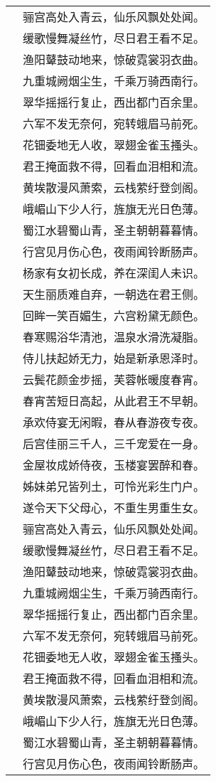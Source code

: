 \documentclass[12pt]{article}
\begin{document}
\begin{longtable}{ll}
            & 骊宫高处入青云，仙乐风飘处处闻。 \\
            & 缓歌慢舞凝丝竹，尽日君王看不足。 \\
            & 渔阳鼙鼓动地来，惊破霓裳羽衣曲。 \\
            & 九重城阙烟尘生，千乘万骑西南行。 \\
            & 翠华摇摇行复止，西出都门百余里。 \\
            & 六军不发无奈何，宛转蛾眉马前死。 \\
            & 花钿委地无人收，翠翅金雀玉搔头。 \\
            & 君王掩面救不得，回看血泪相和流。 \\
            & 黄埃散漫风萧索，云栈萦纡登剑阁。 \\
            & 峨嵋山下少人行，旌旗无光日色薄。 \\
            & 蜀江水碧蜀山青，圣主朝朝暮暮情。 \\
            & 行宫见月伤心色，夜雨闻铃断肠声。 \\
            & 杨家有女初长成，养在深闺人未识。 \\
            & 天生丽质难自弃，一朝选在君王侧。 \\
            & 回眸一笑百媚生，六宫粉黛无颜色。 \\
            & 春寒赐浴华清池，温泉水滑洗凝脂。 \\
            & 侍儿扶起娇无力，始是新承恩泽时。 \\
            & 云鬓花颜金步摇，芙蓉帐暖度春宵。 \\
            & 春宵苦短日高起，从此君王不早朝。 \\
            & 承欢侍宴无闲暇，春从春游夜专夜。 \\
            & 后宫佳丽三千人，三千宠爱在一身。 \\
            & 金屋妆成娇侍夜，玉楼宴罢醉和春。 \\
            & 姊妹弟兄皆列土，可怜光彩生门户。 \\
            & 遂令天下父母心，不重生男重生女。 \\
            & 骊宫高处入青云，仙乐风飘处处闻。 \\
            & 缓歌慢舞凝丝竹，尽日君王看不足。 \\
            & 渔阳鼙鼓动地来，惊破霓裳羽衣曲。 \\
            & 九重城阙烟尘生，千乘万骑西南行。 \\
            & 翠华摇摇行复止，西出都门百余里。 \\
            & 六军不发无奈何，宛转蛾眉马前死。 \\
            & 花钿委地无人收，翠翅金雀玉搔头。 \\
            & 君王掩面救不得，回看血泪相和流。 \\
            & 黄埃散漫风萧索，云栈萦纡登剑阁。 \\
            & 峨嵋山下少人行，旌旗无光日色薄。 \\
            & 蜀江水碧蜀山青，圣主朝朝暮暮情。 \\
            & 行宫见月伤心色，夜雨闻铃断肠声。 \\
        \end{longtable}
\end{document}
